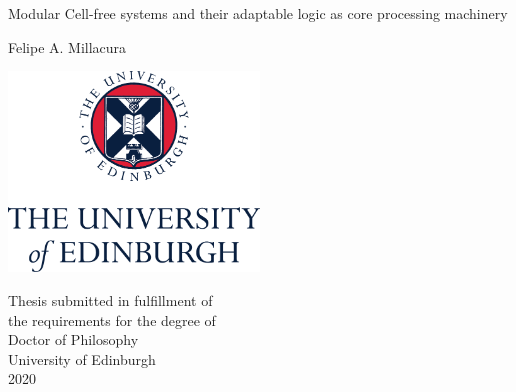 \begin{singlespace}
\thispagestyle{empty}

\begin{minipage}{\textwidth}
\end{minipage}
\begin{center}
\vspace{2cm}
{ \Huge Modular Cell-free systems and their adaptable logic as core processing machinery}
  \par
  \vspace{1cm} 
{\Large Felipe A. Millacura \par}

\end{center}
\vfill
\begin{center}
\vspace{5cm}    
\centerline{\includegraphics[width=0.5\textwidth]{../preface/UoECentredLogoCMYKv1160215.png}}
\vspace{0.5cm}
Thesis submitted in fulfillment of\\
the requirements for the degree of\\ 
Doctor of Philosophy\\
University of Edinburgh \\
2020
\end{center}

\newpage
\thispagestyle{empty}

\end{singlespace}

